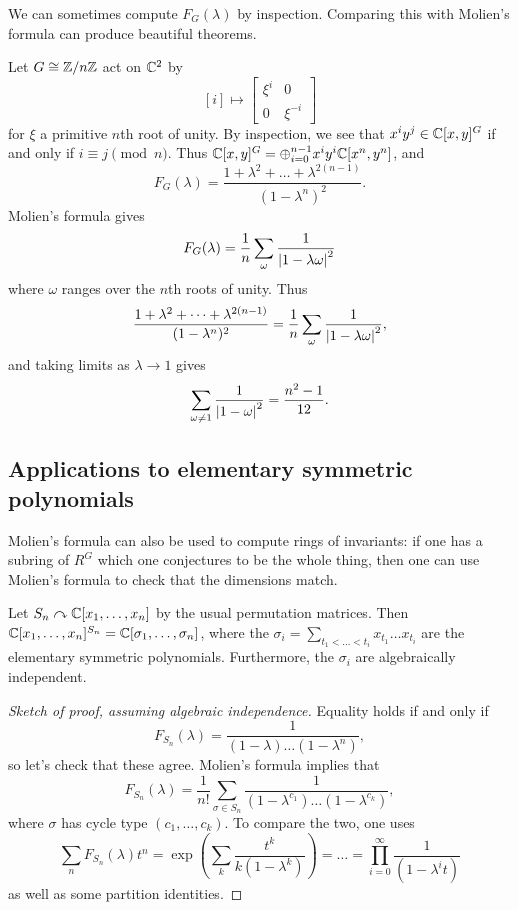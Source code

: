 \documentclass{amsart}
\begin{document}
We can sometimes compute $F_G(\lambda)$ by inspection.
Comparing this with Molien's formula can produce beautiful theorems.

\begin{ex}
	Let $G \cong \mathbb{Z} / n \mathbb{Z}$ act on $\mathbb{C}^2$ by
	\[
		[i] \mapsto \begin{bmatrix}
			\xi^i & 0 \\
			0 & \xi^{-i}
		\end{bmatrix}
	\]
	for $\xi$ a primitive $n$th root of unity.
	By inspection, we see that $x^i y^j \in \mathbb{C}[x, y]^G$ if and only if $i \equiv j \pmod n$.
	Thus $\mathbb{C}[x, y]^G = \oplus_{i=0}^{n-1} x^i y^i \mathbb{C}[x^n, y^n]$, and 
	\[
		F_G(\lambda) = \frac{1 + \lambda^2 + \dots + \lambda^{2(n-1)}}{(1 - \lambda^n)^2}.
	\]
	Molien's formula gives
	\[
		F_G(\lambda) = \frac{1}{n} \sum_\omega \frac{1}{\left|{1 - \lambda \omega}\right|^2}
	\]
	where $\omega$ ranges over the $n$th roots of unity.
	Thus
	\[
		\frac{1 + \lambda^2 + \dots + \lambda^{2(n-1)}}{(1 - \lambda^n)^2} = \frac{1}{n} \sum_\omega \frac{1}{\left|{1 - \lambda \omega}\right|^2},
	\]
	and taking limits as $\lambda \to 1$ gives
	\[
		\sum_{\omega \neq 1} \frac{1}{\left|{1 - \omega}\right|^2} = \frac{n^2 - 1}{12}.
	\]
\end{ex}

\subsection{Applications to elementary symmetric polynomials}

Molien's formula can also be used to compute rings of invariants: if one has a subring of $R^G$ which one conjectures to be the whole thing, then one can use Molien's formula to check that the dimensions match.

\begin{thm}
	Let $S_n \curvearrowright \mathbb{C}[x_1, \dots, x_n]$ by the usual permutation matrices.
	Then $\mathbb{C}[x_1, \dots, x_n]^{S_n} = \mathbb{C}[\sigma_1, \dots, \sigma_n]$, where the $\sigma_i = \sum_{t_1 < \dots < t_i} x_{t_1} \dots x_{t_i}$ are the elementary symmetric polynomials.
	Furthermore, the $\sigma_i$ are algebraically independent.
\end{thm}

\begin{proof}[Sketch of proof, assuming algebraic independence]
	Equality holds if and only if
	\[
		F_{S_n}(\lambda) = \frac{1}{(1 - \lambda) \dots (1 - \lambda^n)},
	\]
	so let's check that these agree.
	Molien's formula implies that
	\[
		F_{S_n}(\lambda) = \frac{1}{n!} \sum_{\sigma \in S_n} \frac{1}{(1 - \lambda^{c_1}) \dots (1 - \lambda^{c_k})},
	\]
	where $\sigma$ has cycle type $(c_1, \dots, c_k)$.
	To compare the two, one uses
	\[
		\sum_n F_{S_n}(\lambda) t^n = \exp\left(\sum_k \frac{t^k}{k (1 - \lambda^k)}\right) = \dots = \prod_{i=0}^\infty \frac{1}{(1 - \lambda^i t)}
	\]
	as well as some partition identities.
\end{proof}
\end{document}
